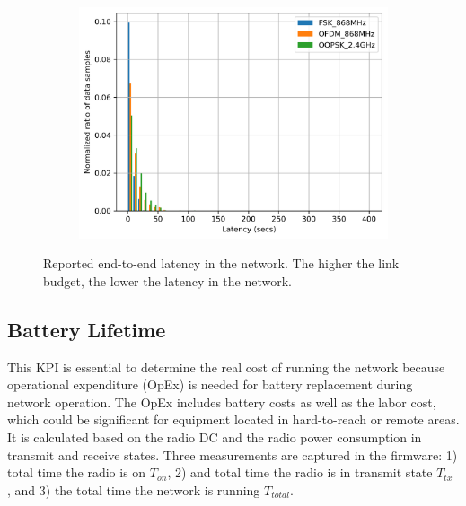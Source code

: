 \documentclass[journal]{IEEEtran}
\begin{document}
\begin{figure}
\begin{subfigure}{0.6\columnwidth}
        \label{fig:latency_cdf}
	\end{subfigure}%
    ~ 
	\begin{subfigure}{0.6\columnwidth}
		\centering
	\includegraphics[width=1\columnwidth]{latency_pdf}
	\label{fig:latency_pdf}
	\end{subfigure}%

	\caption{Reported end-to-end latency in the network. The higher the link budget, the lower the latency in the network.} 
	\label{fig:latency_all}
\end{figure}

\subsection{Battery Lifetime}
\label{sec:battery_lifetime}


This KPI is essential to determine the real cost of running the network because operational expenditure (OpEx) is needed for battery replacement during network operation. 
The OpEx includes battery costs as well as the labor cost, which could be significant for equipment located in hard-to-reach or remote areas. 
It is calculated based on the radio DC and the radio power consumption in transmit and receive states. 
Three measurements are captured in the firmware: 1) total time the radio is on $T_{on}$, 2) and total time the radio is in transmit state $T_{tx}$ , and 3) the total time the network is running $T_{total}$. 
\end{document}
